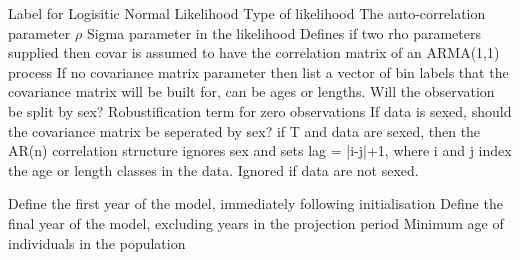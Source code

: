 \par\textbf{}\par
\par\textbf{}\par
\par\textbf{}\par
\par\textbf{}\par
\par\textbf{}\par
\par\textbf{}\par
{} {Label for Logisitic Normal Likelihood}
 {Type of likelihood}
 {The auto-correlation parameter $\rho$}
 {Sigma parameter in the likelihood}
 {Defines if two rho parameters supplied then covar is assumed to have the correlation matrix of an ARMA(1,1) process}
 {If no covariance matrix parameter then list a vector of bin labels that the covariance matrix will be built for, can be ages or lengths.}
 {Will the observation be split by sex?}
 {Robustification term for zero observations}
 {If data is sexed, should the covariance matrix be seperated by sex?}
 {if T and data are sexed, then the AR(n) correlation structure ignores sex and sets lag = |i-j|+1, where i and j index the age or length classes in the data.  Ignored if data are not sexed.}
\par\textbf{}\par
\par\textbf{}\par
\par\textbf{}\par
{}\par\par
{} {Define the first year of the model, immediately following initialisation}
 {Define the final year of the model, excluding years in the projection period}
 {Minimum age of individuals in the population}
